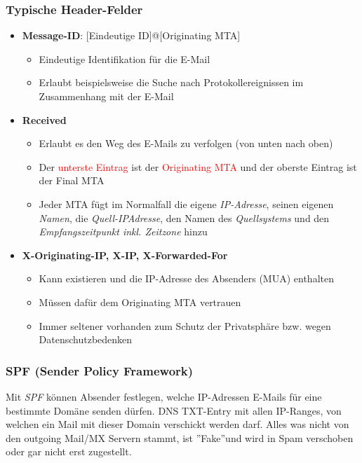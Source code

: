 \subsubsection{Typische Header-Felder}
\begin{itemize}
    \item \textbf{Message-ID}: [Eindeutige ID]@[Originating MTA]
    \begin{itemize}
        \item Eindeutige Identifikation für die E-Mail
        \item Erlaubt beispielsweise die Suche nach Protokollereignissen im Zusammenhang mit der E-Mail
    \end{itemize}
    \item \textbf{Received}
    \begin{itemize}
        \item Erlaubt es den Weg des E-Mails zu verfolgen (von unten nach oben)
        \item Der \textcolor{red}{unterste Eintrag} ist der \textcolor{red}{Originating MTA} und der \textcolor{OSTPink}{oberste Eintrag} ist der \textcolor{OSTPink}{Final MTA}
        \item Jeder MTA fügt im Normalfall die eigene \textit{IP-Adresse}, seinen eigenen \textit{Namen}, die \textit{Quell-IPAdresse}, den Namen des \textit{Quellsystems} und den \textit{Empfangszeitpunkt inkl. Zeitzone} hinzu
    \end{itemize}
    \item \textbf{X-Originating-IP, X-IP, X-Forwarded-For}
    \begin{itemize}
        \item Kann existieren und die IP-Adresse des Absenders (MUA) enthalten
        \item Müssen dafür dem Originating MTA vertrauen
        \item Immer seltener vorhanden zum Schutz der Privatsphäre bzw. wegen Datenschutzbedenken
    \end{itemize}
\end{itemize}

\subsubsection{SPF (Sender Policy Framework)}
Mit \textit{SPF} können Absender festlegen, welche IP-Adressen E-Mails für eine bestimmte Domäne senden dürfen.
DNS TXT-Entry mit allen IP-Ranges, von welchen ein Mail mit dieser Domain verschickt werden darf.
Alles was nicht von den outgoing Mail/MX Servern stammt, ist ''Fake''und wird in Spam verschoben oder gar nicht erst zugestellt.\\


